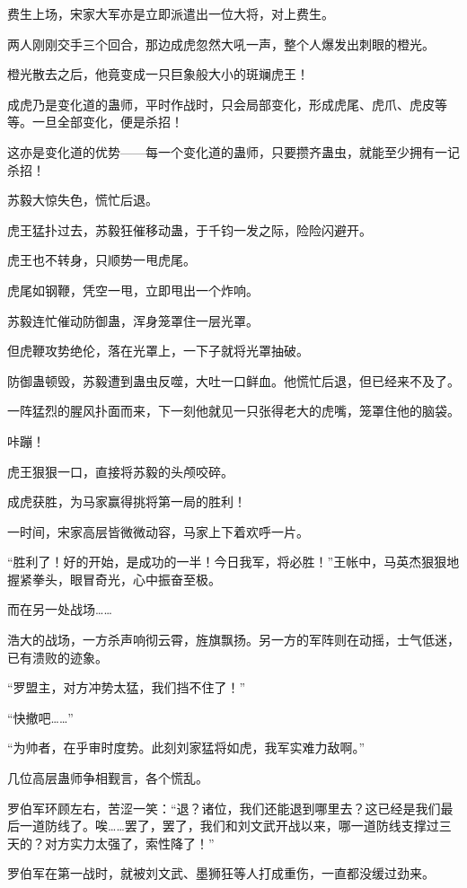 \begin{this_body}
费生上场，宋家大军亦是立即派遣出一位大将，对上费生。

两人刚刚交手三个回合，那边成虎忽然大吼一声，整个人爆发出刺眼的橙光。

橙光散去之后，他竟变成一只巨象般大小的斑斓虎王！

成虎乃是变化道的蛊师，平时作战时，只会局部变化，形成虎尾、虎爪、虎皮等等。一旦全部变化，便是杀招！

这亦是变化道的优势——每一个变化道的蛊师，只要攒齐蛊虫，就能至少拥有一记杀招！

苏毅大惊失色，慌忙后退。

虎王猛扑过去，苏毅狂催移动蛊，于千钧一发之际，险险闪避开。

虎王也不转身，只顺势一甩虎尾。

虎尾如钢鞭，凭空一甩，立即甩出一个炸响。

苏毅连忙催动防御蛊，浑身笼罩住一层光罩。

但虎鞭攻势绝伦，落在光罩上，一下子就将光罩抽破。

防御蛊顿毁，苏毅遭到蛊虫反噬，大吐一口鲜血。他慌忙后退，但已经来不及了。

一阵猛烈的腥风扑面而来，下一刻他就见一只张得老大的虎嘴，笼罩住他的脑袋。

咔蹦！

虎王狠狠一口，直接将苏毅的头颅咬碎。

成虎获胜，为马家赢得挑将第一局的胜利！

一时间，宋家高层皆微微动容，马家上下着欢呼一片。

“胜利了！好的开始，是成功的一半！今日我军，将必胜！”王帐中，马英杰狠狠地握紧拳头，眼冒奇光，心中振奋至极。

而在另一处战场……

浩大的战场，一方杀声响彻云霄，旌旗飘扬。另一方的军阵则在动摇，士气低迷，已有溃败的迹象。

“罗盟主，对方冲势太猛，我们挡不住了！”

“快撤吧……”

“为帅者，在乎审时度势。此刻刘家猛将如虎，我军实难力敌啊。”

几位高层蛊师争相觐言，各个慌乱。

罗伯军环顾左右，苦涩一笑：“退？诸位，我们还能退到哪里去？这已经是我们最后一道防线了。唉……罢了，罢了，我们和刘文武开战以来，哪一道防线支撑过三天的？对方实力太强了，索性降了！”

罗伯军在第一战时，就被刘文武、墨狮狂等人打成重伤，一直都没缓过劲来。


\end{this_body}
